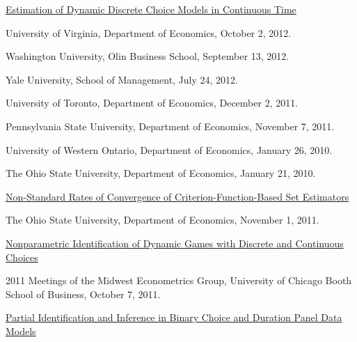 \documentclass[10pt,letterpaper]{article}
\renewenvironment{itemize}{
  \begin{list}{}{
    \setlength{\leftmargin}{1.5em}
    \setlength{\itemsep}{0.25em}
    \setlength{\parskip}{0pt}
    \setlength{\parsep}{0.25em}
  }
}{
  \end{list}
}
\begin{document}
\begin{itemize}

\item \href{http://jblevins.org/research/abbe}{Estimation of Dynamic Discrete Choice Models in Continuous Time}

  \begin{itemize}
  \item University of Virginia, Department of Economics,
    October 2, 2012.
  \item Washington University, Olin Business School,
    September 13, 2012.
  \item Yale University, School of Management,
    July 24, 2012.
  \item University of Toronto, Department of Economics,
    December 2, 2011.
  \item Pennsylvania State University, Department of Economics,
    November 7, 2011.
  \item University of Western Ontario, Department of Economics,
    January 26, 2010.
  \item The Ohio State University, Department of Economics,
    January 21, 2010.
  \end{itemize}

\item \href{http://jblevins.org/research/cuberoot}{Non-Standard Rates of Convergence of Criterion-Function-Based Set Estimators}

  \begin{itemize}
  \item The Ohio State University, Department of Economics,
    November 1, 2011.
  \end{itemize}

\item \href{http://jblevins.org/research/dcident}{Nonparametric Identification of Dynamic Games with Discrete and Continuous Choices}

  \begin{itemize}
    \item 2011 Meetings of the Midwest Econometrics Group,
      University of Chicago Booth School of Business,
      October 7, 2011.
  \end{itemize}

\item \href{http://jblevins.org/research/panel}{Partial Identification and Inference in Binary Choice and Duration
    Panel Data Models}


\end{itemize}
\end{document}
